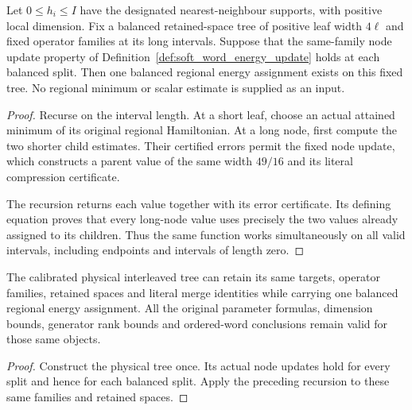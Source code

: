 \begin{lemma}
    \label{lem:balanced_regional_energy_assignment}
    \leanok
    Let $0\le h_i\le I$ have the designated nearest-neighbour supports,
    with positive local dimension. Fix a balanced retained-space tree of
    positive leaf width $4\ell$ and fixed operator families at its long
    intervals. Suppose that the same-family node update property of
    Definition~\ref{def:soft_word_energy_update} holds at each balanced split.
    Then one balanced regional energy assignment exists on this fixed tree.
    No regional minimum or scalar estimate is supplied as an input.
\end{lemma}
\begin{proof}\leanok
    Recurse on the interval length. At a short leaf, choose an actual
    attained minimum of its original regional Hamiltonian. At a long node,
    first compute the two shorter child estimates. Their certified errors
    permit the fixed node update, which constructs a parent value of the
    same width $49/16$ and its literal compression certificate.

    The recursion returns each value together with its error certificate.
    Its defining equation proves that every long-node value uses precisely
    the two values already assigned to its children. Thus the same function
    works simultaneously on all valid intervals, including endpoints and
    intervals of length zero.
\end{proof}

\begin{lemma}
    \label{lem:physical_interleaved_tree_recursive_energy}
    \leanok
    The calibrated physical interleaved tree can retain its same targets,
    operator families, retained spaces and literal merge identities while
    carrying one balanced regional energy assignment. All the original
    parameter formulas, dimension bounds, generator rank bounds and
    ordered-word conclusions remain valid for those same objects.
\end{lemma}
\begin{proof}\leanok
    Construct the physical tree once. Its actual node updates hold for
    every split and hence for each balanced split. Apply the preceding
    recursion to these same families and retained spaces.
\end{proof}

